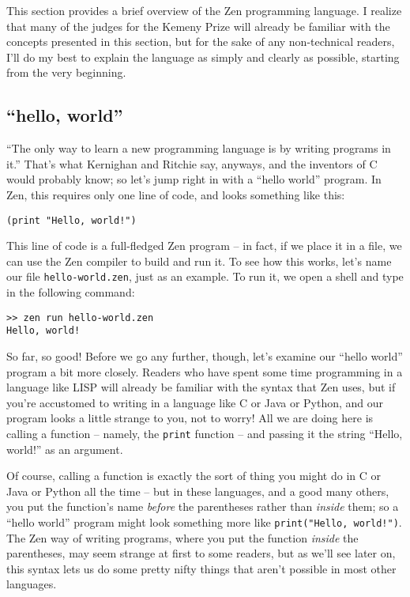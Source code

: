 \documentclass{article}
\begin{document}
This section provides a brief overview of the Zen programming language. I realize that many of the judges for the Kemeny Prize will already be familiar with the concepts presented in this section, but for the sake of any non-technical readers, I'll do my best to explain the language as simply and clearly as possible, starting from the very beginning.


\subsection{``hello, world''}
``The only way to learn a new programming language is by writing programs in it.'' That's what Kernighan and Ritchie say, anyways, and the inventors of C would probably know; so let's jump right in with a ``hello world'' program. In Zen, this requires only one line of code, and looks something like this:

\begin{lstlisting}
(print "Hello, world!")
\end{lstlisting}

This line of code is a full-fledged Zen program -- in fact, if we place it in a file, we can use the Zen compiler to build and run it. To see how this works, let's name our file \lstinline{hello-world.zen}, just as an example. To run it, we open a shell and type in the following command:

\begin{lstlisting}
>> zen run hello-world.zen
Hello, world!
\end{lstlisting}

So far, so good! Before we go any further, though, let's examine our ``hello world'' program a bit more closely. Readers who have spent some time programming in a language like LISP will already be familiar with the syntax that Zen uses, but if you're accustomed to writing in a language like C or Java or Python, and our program looks a little strange to you, not to worry! All we are doing here is calling a function -- namely, the \lstinline{print} function -- and passing it the string ``Hello, world!'' as an argument.

Of course, calling a function is exactly the sort of thing you might do in C or Java or Python all the time -- but in these languages, and a good many others, you put the function's name {\em before} the parentheses rather than {\em inside} them; so a ``hello world'' program might look something more like \lstinline{print("Hello, world!")}. The Zen way of writing programs, where you put the function {\em inside} the parentheses, may seem strange at first to some readers, but as we'll see later on, this syntax lets us do some pretty nifty things that aren't possible in most other languages.
\end{document}
